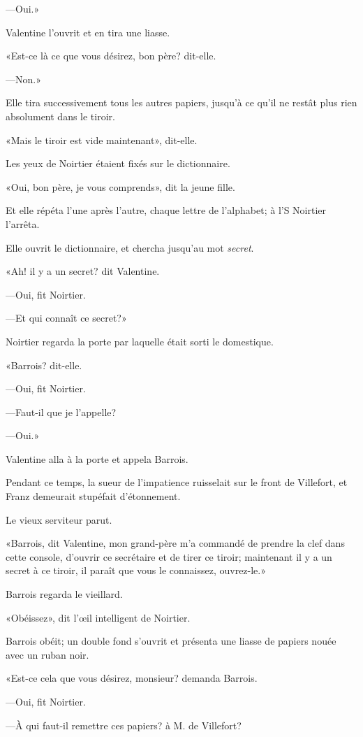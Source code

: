 —Oui.» 

Valentine l'ouvrit et en tira une liasse. 

«Est-ce là ce que vous désirez, bon père? dit-elle. 

—Non.» 

Elle tira successivement tous les autres papiers, jusqu'à ce qu'il ne restât plus rien absolument dans le tiroir. 

«Mais le tiroir est vide maintenant», dit-elle. 

Les yeux de Noirtier étaient fixés sur le dictionnaire. 

«Oui, bon père, je vous comprends», dit la jeune fille. 

Et elle répéta l'une après l'autre, chaque lettre de l'alphabet; à l'S Noirtier l'arrêta. 

Elle ouvrit le dictionnaire, et chercha jusqu'au mot \textit{secret}. 

«Ah! il y a un secret? dit Valentine. 

—Oui, fit Noirtier. 

—Et qui connaît ce secret?»  

Noirtier regarda la porte par laquelle était sorti le domestique. 

«Barrois? dit-elle. 

—Oui, fit Noirtier. 

—Faut-il que je l'appelle? 

—Oui.» 

Valentine alla à la porte et appela Barrois. 

Pendant ce temps, la sueur de l'impatience ruisselait sur le front de Villefort, et Franz demeurait stupéfait d'étonnement. 

Le vieux serviteur parut. 

«Barrois, dit Valentine, mon grand-père m'a commandé de prendre la clef dans cette console, d'ouvrir ce secrétaire et de tirer ce tiroir; maintenant il y a un secret à ce tiroir, il paraît que vous le connaissez, ouvrez-le.» 

Barrois regarda le vieillard. 

«Obéissez», dit l'œil intelligent de Noirtier. 

Barrois obéit; un double fond s'ouvrit et présenta une liasse de papiers nouée avec un ruban noir. 

«Est-ce cela que vous désirez, monsieur? demanda Barrois. 

—Oui, fit Noirtier. 

—À qui faut-il remettre ces papiers? à M. de Villefort? 

